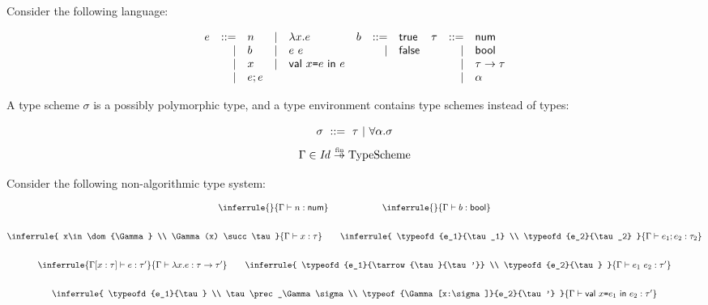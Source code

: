 \begin{exercise}

Consider the following language:

\vspace{-1em}

\[
\begin{array}{rrlrlrrlrrl}
  e &::=& n &|& \lambda x.e & b &::=& \textsf{true} & \tau &::=& \textsf{num} \\
  &|& b &|& e\ e & &|& \textsf{false} &&|& \textsf{bool} \\
  &|& x &|& \textsf{val}\ x\texttt{=} e\ \textsf{in}\ e &&&&&|& \tau\rightarrow\tau \\
  &|& e;e &&&&&&&|& \alpha \\
\end{array}
\]

A type scheme $\sigma$ is a possibly polymorphic type,
and a type environment contains type schemes instead of types:

\vspace{-1em}

\[ \sigma\ ::=\ \tau\ |\ \tforall{\alpha}{\sigma} \]
\[ \Gamma \in \embox{Id}\finto\text{TypeScheme} \]

Consider the following non-algorithmic type system:

\vspace{-1em}

\[
\begin{array}{@{}c@{}}
  \inferrule
  {}
  { \typeofd{n}{\tnum} }
  \qquad
  \qquad
  \qquad
  \inferrule
  {}
  { \typeofd{b}{\tbool} }
  \\[2em]
  \inferrule
  {
    x\in\dom{\Gamma} \\
    \Gamma(x) \succ \tau
  }
  { \typeofd{x}{\tau} }
  \qquad
  \inferrule
  {
    \typeofd{e_1}{\tau_1} \\
    \typeofd{e_2}{\tau_2}
  }
  { \typeofd{\eseq{e_1}{e_2}}{\tau_2} }
  \\[2em]
  \inferrule
  { \typeof{\Gamma[x:\tau]}{e}{\tau'} }
  { \typeofd{\efun{x}{e}}{\tarrow{\tau}{\tau'}} }
  \qquad
  \inferrule
  {
    \typeofd{e_1}{\tarrow{\tau}{\tau'}} \\
    \typeofd{e_2}{\tau}
  }
  { \typeofd{\eapp{e_1}{e_2}}{\tau'} }
  \\[2em]
  \inferrule
  {
    \typeofd{e_1}{\tau} \\
    \tau\prec_\Gamma\sigma \\
    \typeof{\Gamma[x:\sigma]}{e_2}{\tau'}
  }
  { \typeofd{\ebind{x}{e_1}{e_2}}{\tau'} }
\end{array}
\]


\end{exercise}

